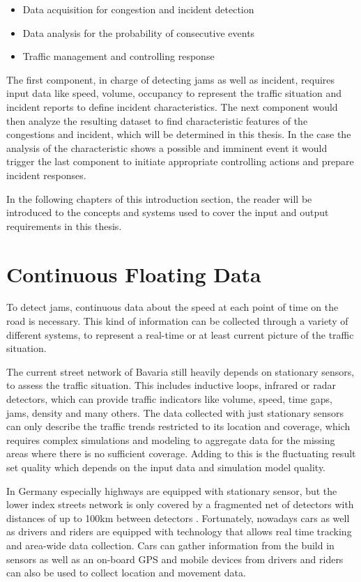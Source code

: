 \documentclass[a4paper,12pt]{report}
\begin{document}
\begin{itemize}
  \item Data acquisition for congestion and incident detection
  \item Data analysis for the probability of consecutive events
  \item Traffic management and controlling response
\end{itemize}

The first component, in charge of detecting \glspl{jam} as well as incident, requires input data like speed, volume, occupancy to represent the traffic situation and incident reports to define incident characteristics. The next component would then analyze the resulting dataset to find characteristic features of the congestions and incident, which will be determined in this thesis. In the case the analysis of the characteristic shows a possible and imminent event it would trigger the last component to initiate appropriate controlling actions and prepare incident responses.

In the following chapters of this introduction section, the reader will be introduced to the concepts and systems used to cover the input and output requirements in this thesis.

\section{Continuous Floating Data}

To detect \glspl{jam}, continuous data about the speed at each point of time on the road is necessary. This kind of information can be collected through a variety of different systems, to represent a real-time or at least current picture of the traffic situation. 

The current street network of Bavaria still heavily depends on stationary sensors, to assess the traffic situation. This includes inductive loops, infrared or radar detectors, which can provide traffic indicators like volume, speed, time gaps, jams, density and many others. The data collected with just stationary sensors can only describe the traffic trends restricted to its location and coverage, which requires complex simulations and modeling to aggregate data for the missing areas where there is no sufficient coverage. Adding to this is the fluctuating result set quality which depends on the input data and simulation model quality. 

In Germany especially highways are equipped with stationary sensor, but the lower index streets network is only covered by a fragmented net of detectors with distances of up to 100km between detectors \cite{INDRIX2015}. Fortunately, nowadays cars as well as drivers and riders are equipped with technology that allows real time tracking and area-wide data collection. Cars can gather information from the build in sensors as well as an on-board GPS and mobile devices from drivers and riders can also be used to collect location and movement data. \cite{Randelhoff2016}
\end{document}
